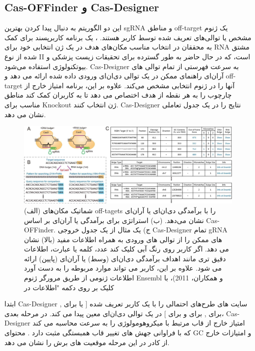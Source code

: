 \documentclass[12pt,a4paper,BCOR=.7cm,headsepline,bibliography=totoc]{report}
\begin{document}
\subsection{Cas-OFFinder و Cas-Designer ~\cite{Cas-OFFinder, Cas-Designer}}
این دو الگوریتم به دنبال پیدا کردن بهترین sgRNA و مناطق off-target یک ژنوم مشخص یا توالی‌های تعریف شده توسط کاربر هستند.
،
 یک برنامه کاربرپسند برای کمک به محققان در انتخاب مناسب مکان‌های هدف در یک ژن انتخابی خود برای RNA مشتق شده از نوع II است، که در حال حاضر به طور گسترده برای تحقیقات زیست پزشکی و بیوتکنولوژی استفاده می‌شود. Cas-Designer به سرعت فهرستی از تمام توالی های آر‌ان‌ای راهنمای ممکن در یک توالی دی‌ان‌ای ورودی داده شده ارائه می دهد
 و off-target آنها را در ژنوم انتخابی مشخص می‌کند. علاوه بر این، برنامه امتیاز خارج از چارچوب را به هر نقطه از هدف اختصاص می دهد تا به کاربران کمک کند مناطق مناسب برای Knockout ژن انتخاب کنند.
 Cas-Designer نتایج را در یک جدول تعاملی نشان می دهد.

\begin{figure}[!h]
\centering
\includegraphics[width=16cm, ]{pictures/Cas-Designer.jpg}
\caption{
(الف) شماتیک مکان‌های off-tagets را با برآمدگی دی‌ان‌ای یا آر‌ان‌ای نشان می‌دهد. (ب) استراتژی برای  برآمدگی  یا آر‌ان‌ای بر اساس Cas-OFFinder. ج) یک مثال
از یک جدول خروجی Cas-Designer تمام gRNA های ممکن را از توالی های ورودی به همراه اطلاعات مفید (بالا) نشان می دهد. اگر کاربر روی رنگ آبی کلیک کند
عدد، کلمه یا عبارت، اطلاعات دقیق تری مانند اهداف برآمدگی دی‌ان‌ای (وسط) یا آر‌ان‌ای (پایین) ارائه می شود. علاوه بر این، کاربر می تواند موارد مربوطه را به دست آورد
اطلاعات ژنومی از طریق مرورگر ژنوم Ensembl  و همکاران، 2011)، با کلیک بر روی دکمه "اطلاعات در  \cite{Cas-OFFinder}
}\label{fig:4}
\end{figure}

ابتدا Cas-Designer سایت های طرح‌های احتمالی را با یک کاربر تعریف شده [ یا  برای ,  برای ,  برای  و  برای ] در یک توالی دی‌ان‌ای معین  پیدا می کند. در مرحله بعدی، Cas-Designer
امتیاز خارج از قاب مرتبط با میکروهومولوژی را به سرعت محاسبه می کند که با فراوانی جهش های تغییر قاب همبستگی مثبت دارد . محتوای GC و امتیازات خارج از کادر در این مرحله موقعیت های برش را نشان می دهد.
\end{document}
